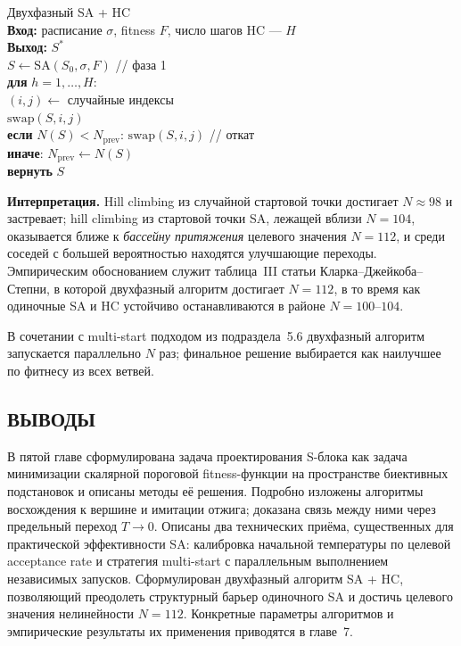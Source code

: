 \begin{algorithm}{Двухфазный SA + HC}\hfill\\
\textbf{Вход:} расписание $\sigma$, fitness $F$, число шагов HC --- $H$ \\
\textbf{Выход:} $S^*$ \\[2pt]
$S \leftarrow \mathrm{SA}(S_0, \sigma, F)$ \quad // фаза 1 \\
\textbf{для} $h = 1, \dots, H$: \\
\quad $(i, j) \leftarrow$ случайные индексы \\
\quad $\mathrm{swap}(S, i, j)$ \\
\quad \textbf{если} $N(S) < N_{\mathrm{prev}}$: $\mathrm{swap}(S, i, j)$ \quad // откат \\
\quad \textbf{иначе}: $N_{\mathrm{prev}} \leftarrow N(S)$ \\
\textbf{вернуть} $S$
\end{algorithm}

\textbf{Интерпретация.} Hill climbing из случайной стартовой точки
достигает $N \approx 98$ и застревает; hill climbing из стартовой
точки SA, лежащей вблизи $N = 104$, оказывается ближе к
\emph{бассейну притяжения} целевого значения $N = 112$, и среди
соседей с большей вероятностью находятся улучшающие переходы.
Эмпирическим обоснованием служит таблица~III статьи Кларка–Джейкоба–Степни,
в которой двухфазный алгоритм достигает $N = 112$, в то время как
одиночные SA и HC устойчиво останавливаются в районе
$N = 100$–$104$.

В сочетании с multi-start подходом из подраздела~5.6 двухфазный
алгоритм запускается параллельно $N$ раз; финальное решение
выбирается как наилучшее по фитнесу из всех ветвей.

\subsection*{ВЫВОДЫ}

В пятой главе сформулирована задача проектирования S-блока как
задача минимизации скалярной пороговой fitness-функции на
пространстве биективных подстановок и описаны методы её решения.
Подробно изложены алгоритмы восхождения к вершине и имитации отжига;
доказана связь между ними через предельный переход $T \to 0$.
Описаны два технических приёма, существенных для практической
эффективности SA: калибровка начальной температуры по целевой
acceptance rate и стратегия multi-start с параллельным выполнением
независимых запусков. Сформулирован двухфазный алгоритм SA + HC,
позволяющий преодолеть структурный барьер одиночного SA и
достичь целевого значения нелинейности $N = 112$. Конкретные
параметры алгоритмов и эмпирические результаты их применения
приводятся в главе~7.


